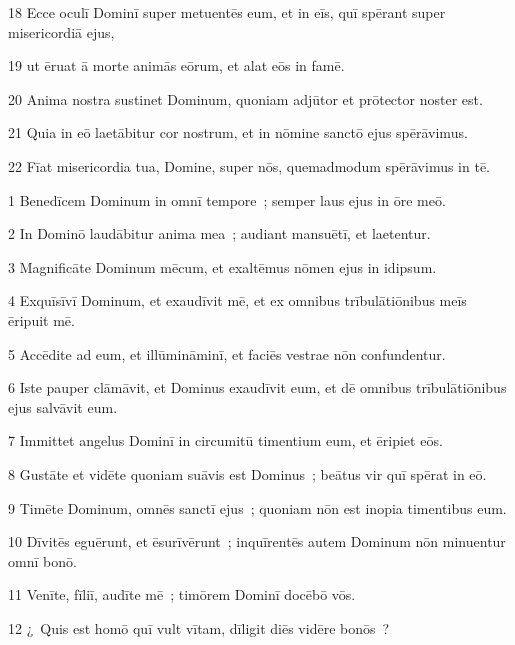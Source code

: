 \psalmVerse
  {\phantom{0}18}
  {Ecce oculī Dominī super metuentēs eum, et in eīs, quī spērant super misericordiā ejus,}


\psalmVerse
  {\phantom{0}19}
  {ut ēruat ā morte animās eōrum, et alat eōs in famē.}


\psalmVerse
  {\phantom{0}20}
  {Anima nostra sustinet Dominum, quoniam adjūtor et prōtector noster est.}


\psalmVerse
  {\phantom{0}21}
  {Quia in eō laetābitur cor nostrum, et in nōmine sanctō ejus spērāvimus.}


\psalmVerse
  {\phantom{0}22}
  {Fīat misericordia tua, Domine, super nōs, quemadmodum spērāvimus in tē.}



\psalmVerse
  {\phantom{00}1}
  {Benedīcem Dominum in omnī tempore~; semper laus ejus in ōre meō.}


\psalmVerse
  {\phantom{00}2}
  {In Dominō laudābitur anima mea~; audiant mansuētī, et laetentur.}


\psalmVerse
  {\phantom{00}3}
  {Magnificāte Dominum mēcum, et exaltēmus nōmen ejus in idipsum.}


\psalmVerse
  {\phantom{00}4}
  {Exquīsīvī Dominum, et exaudīvit mē, et ex omnibus trībulātiōnibus meīs ēripuit mē.}


\psalmVerse
  {\phantom{00}5}
  {Accēdite ad eum, et illūmināminī, et faciēs vestrae nōn confundentur.}


\psalmVerse
  {\phantom{00}6}
  {Iste pauper clāmāvit, et Dominus exaudīvit eum, et dē omnibus trībulātiōnibus ejus salvāvit eum.}


\psalmVerse
  {\phantom{00}7}
  {Immittet angelus Dominī in circumitū timentium eum, et ēripiet eōs.}


\psalmVerse
  {\phantom{00}8}
  {Gustāte et vidēte quoniam suāvis est Dominus~; beātus vir quī spērat in eō.}


\psalmVerse
  {\phantom{00}9}
  {Timēte Dominum, omnēs sanctī ejus~; quoniam nōn est inopia timentibus eum.}


\psalmVerse
  {\phantom{0}10}
  {Dīvitēs eguērunt, et ēsurīvērunt~; inquīrentēs autem Dominum nōn minuentur omnī bonō.}


\psalmVerse
  {\phantom{0}11}
  {Venīte, fīliī, audīte mē~; timōrem Dominī docēbō vōs.}


\psalmVerse
  {\phantom{0}12}
  {¿~Quis est homō quī vult vītam, dīligit diēs vidēre bonōs~?}


